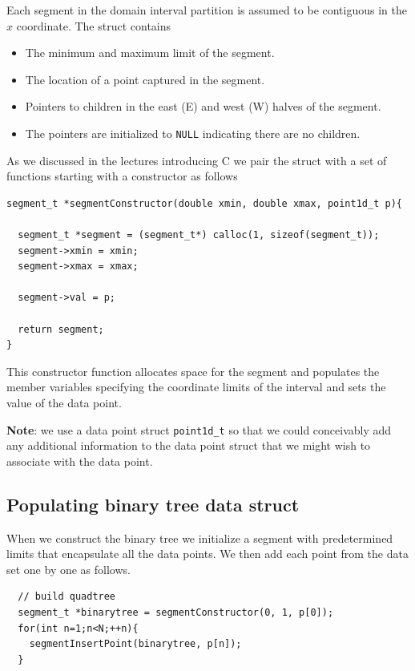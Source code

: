 Each segment in the domain interval partition is assumed to be contiguous in the $x$  coordinate. The struct contains

\begin{itemize}
    \item The minimum and maximum limit of the segment.
    \item The location of a point captured in the segment.
    \item Pointers to children in the east (E) and west (W)  halves of the segment. 
    \item The pointers are initialized to \texttt{NULL} indicating there are no children.
\end{itemize} 

As we  discussed in the lectures introducing C we pair the struct with a set of functions starting with a constructor as follows

\begin{verbatim}
segment_t *segmentConstructor(double xmin, double xmax, point1d_t p){

  segment_t *segment = (segment_t*) calloc(1, sizeof(segment_t));
  segment->xmin = xmin;
  segment->xmax = xmax;

  segment->val = p;

  return segment;
}
\end{verbatim}

This constructor function allocates space for the segment and populates the member variables specifying the coordinate limits of the interval and sets the value of the data point. 

{\bf Note}: we use a data point struct \texttt{point1d\_t} so that we could conceivably add any additional information to the data point struct that we might wish to associate with the data point.

\subsection{Populating binary tree data struct}

When we construct the binary tree we initialize a segment with predetermined limits that encapsulate all the data points. We then add each point from the data set one by one as follows.

\begin{verbatim}
  // build quadtree                                                                       
  segment_t *binarytree = segmentConstructor(0, 1, p[0]);
  for(int n=1;n<N;++n){
    segmentInsertPoint(binarytree, p[n]);
  }
\end{verbatim}

